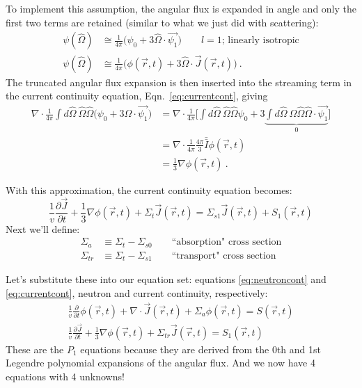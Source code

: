 \documentclass[12pt]{article}
\newcommand{\vOmega}{\ensuremath{\hat{\Omega}}}
\begin{document}
To implement this assumption, the angular flux is expanded in angle and only the first two terms are retained (similar to what we just did with scattering):  
%
\begin{align*}
\psi(\vOmega) &\cong  \frac{1}{4\pi}\bigl( \psi_{0} + 3\vOmega \cdot \vec{\psi_{1}} \bigr) \qquad l=1 \text{; linearly isotropic} \\
%
\psi(\vOmega) &\cong \frac{1}{4\pi}\bigl(\phi(\vec{r}, t) + 3 \vOmega \cdot \vec{J}(\vec{r}, t)\bigr) \:.
\end{align*}
The truncated angular flux expansion is then inserted into the streaming term in the current continuity equation, Eqn.\ \eqref{eq:currentcont}, giving 
%
\begin{align*}
  \nabla \cdot \frac{1}{4\pi} \int d \vOmega \:\vOmega \vOmega  \bigl(\psi_{0} + 3\vOmega \cdot \vec{\psi_{1}}\bigr) &=  
%
\nabla \cdot \frac{1}{4\pi} \bigl[\int d \vOmega \:\vOmega \vOmega  \psi_{0}
%
+ 3 \underbrace{\int d \vOmega \:\vOmega \vOmega \vOmega \cdot \vec{\psi_{1}}}_{0} \bigr] \nonumber \\
% 
&= \nabla \cdot \frac{1}{4\pi} \frac{4\pi}{3}\bar{\bar{I}} \phi(\vec{r}, t) \\
%
  &= \frac{1}{3} \nabla \phi(\vec{r}, t) \:.
\end{align*}

With this approximation, the current continuity equation becomes:
\begin{equation}
\frac{1}{v}\frac{\partial \vec{J}}{\partial t} 
+ \frac{1}{3} \nabla \phi(\vec{r}, t) +
\Sigma_t  \vec{J}(\vec{r}, t) =
\Sigma_{s1} \vec{J}(\vec{r},t)
+ S_{1}(\vec{r}, t) \nonumber
\end{equation}
%
Next we'll define:
\begin{align*}
\Sigma_a &\equiv \Sigma_t - \Sigma_{s0} \qquad \text{``absorption" cross section}\\
\Sigma_{tr} &\equiv \Sigma_t - \Sigma_{s1} \qquad \text{``transport" cross section}
\end{align*}

Let's substitute these into our equation set: equations \eqref{eq:neutroncont} and \eqref{eq:currentcont}, neutron and current continuity, respectively:
%
\begin{align*}
\frac{1}{v}\frac{\partial}{\partial t}\phi(\vec{r}, t) + 
\nabla \cdot \vec{J}(\vec{r}, t) + 
\Sigma_a \phi(\vec{r}, t) =
S(\vec{r}, t) \\
%
\frac{1}{v}\frac{\partial \vec{J}}{\partial t} 
+ \frac{1}{3} \nabla \phi(\vec{r}, t) +
\Sigma_{tr}  \vec{J}(\vec{r}, t) =
S_{1}(\vec{r}, t) 
\end{align*}
%
These are the $P_1$ equations because they are derived from the 0th and 1st Legendre polynomial expansions of the angular flux. And we now have 4 equations with 4 unknowns!
\end{document}
